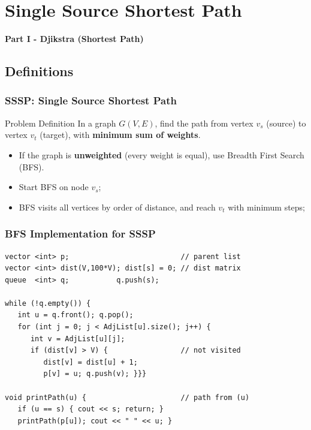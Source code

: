 \section{Single Source Shortest Path}

\begin{frame}
  \begin{center}
    {\bf Part I - Djikstra (Shortest Path)}
  \end{center}
\end{frame}

\subsection{Definitions}
\begin{frame}
  \frametitle{SSSP: Single Source Shortest Path}
  \begin{block}{Problem Definition}
    In a graph $G(V,E)$, find the path from vertex $v_s$ (source) to vertex $v_t$ (target), with {\bf minimum sum of weights}.
  \end{block}\bigskip

  \begin{itemize}
  \item If the graph is {\bf unweighted} (every weight is equal), use Breadth First Search (BFS).\medskip

  \item Start BFS on node $v_s$;\medskip

  \item BFS visits all vertices by order of distance, and reach $v_t$ with minimum steps;
  \end{itemize}
\end{frame}

\begin{frame}[fragile]
  \frametitle{BFS Implementation for SSSP}

{\smaller
\begin{exampleblock}{}
\begin{verbatim}
vector <int> p;                          // parent list
vector <int> dist(V,100*V); dist[s] = 0; // dist matrix
queue  <int> q;           q.push(s);

while (!q.empty()) {
   int u = q.front(); q.pop();
   for (int j = 0; j < AdjList[u].size(); j++) {
      int v = AdjList[u][j];
      if (dist[v] > V) {                 // not visited
         dist[v] = dist[u] + 1;
         p[v] = u; q.push(v); }}}

void printPath(u) {                      // path from (u)
   if (u == s) { cout << s; return; }
   printPath(p[u]); cout << " " << u; }
\end{verbatim}
\end{exampleblock}
}
\end{frame}

